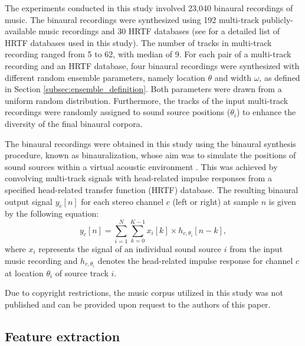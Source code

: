 \documentclass{article}
\begin{document}
The experiments conducted in this study involved 23,040 binaural recordings of music. The binaural recordings were synthesized using 192 multi-track publicly-available music recordings \cite{noauthor_mixing_nodate} and 30 HRTF databases (see  for a detailed list of HRTF databases used in this study). The number of tracks in multi-track recording ranged from 5 to 62, with median of 9. For each pair of a multi-track recording and an HRTF database, four binaural recordings were synthesized with different random ensemble parameters, namely location $\theta$ and width $\omega$, as defined in Section \ref{subsec:ensemble_definition}. Both parameters were drawn from a uniform random distribution. Furthermore, the tracks of the input multi-track recordings were randomly assigned to sound source positions ($\theta_i$) to enhance the diversity of the final binaural corpora.

The binaural recordings were obtained in this study using the binaural synthesis procedure, known as binauralization, whose aim was to simulate the positions of sound sources within a virtual acoustic environment \cite{blauert_spatial_1996}. This was achieved by convolving multi-track signals with head-related impulse responses from a specified head-related transfer function (HRTF) database. The resulting binaural output signal $y_c[n]$ for each stereo channel $c$ (left or right) at sample $n$ is given by the following equation:
\begin{equation}
  y_c[n] = \sum_{i=1}^{N} \sum_{k=0}^{K-1} x_i[k] \times h_{c,\theta_i}[n-k] ,
\end{equation}
where $x_i$ represents the signal of an individual sound source $i$ from the input music recording and $h_{c,\theta_i}$ denotes the head-related impulse response for channel $c$ at location $\theta_i$ of source track $i$.

Due to copyright restrictions, the music corpus utilized in this study was not published and can be provided upon request to the authors of this paper.

\subsection{Feature extraction}
\label{subsec:feature_extraction}

\end{document}
